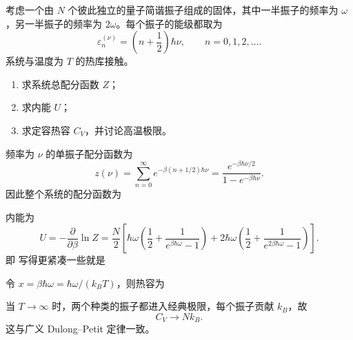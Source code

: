 \begin{question}
考虑一个由 $N$ 个彼此独立的量子简谐振子组成的固体，其中一半振子的频率为 $\omega$，另一半振子的频率为 $2\omega$。每个振子的能级都取为
\[
\varepsilon_n^{(\nu)}=\left(n+\frac12\right)\hbar\nu,
\qquad n=0,1,2,\dots.
\]
系统与温度为 $T$ 的热库接触。

\begin{enumerate}[label=(\arabic*),leftmargin=2.5em]
  \item 求系统总配分函数 $Z$；
  \item 求内能 $U$；
  \item 求定容热容 $C_V$，并讨论高温极限。
\end{enumerate}

\begin{solution}
频率为 $\nu$ 的单振子配分函数为
\[
z(\nu)=\sum_{n=0}^{\infty}e^{-\beta(n+1/2)\hbar\nu}
=\frac{e^{-\beta\hbar\nu/2}}{1-e^{-\beta\hbar\nu}}.
\]
因此整个系统的配分函数为

内能为
\[
U=-\frac{\partial}{\partial\beta}\ln Z
=\frac{N}{2}\left[\hbar\omega\left(\frac12+\frac{1}{e^{\beta\hbar\omega}-1}\right)+2\hbar\omega\left(\frac12+\frac{1}{e^{2\beta\hbar\omega}-1}\right)\right].
\]
即
写得更紧凑一些就是

令 $x=\beta\hbar\omega=\hbar\omega/(k_B T)$，则热容为

当 $T\to\infty$ 时，两个种类的振子都进入经典极限，每个振子贡献 $k_B$，故
\[
C_V\to Nk_B.
\]
这与广义 Dulong--Petit 定律一致。
\end{solution}
\end{question}

